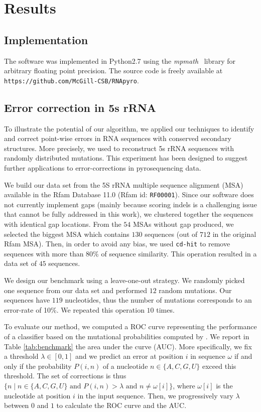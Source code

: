 \section{Results}
\label{sec:results}

\subsection{Implementation}
The software was implemented in Python2.7 using the \textit{mpmath}~\cite{mpmath} library
for  arbitrary floating point precision. The source code is freely available at \verb+https://github.com/McGill-CSB/RNApyro+.

\subsection{Error correction in 5s rRNA}

To illustrate the potential of our algorithm, we applied our techniques to identify and correct point-wise errors in RNA sequences
with conserved secondary structures. More precisely, we used \RNApyro to reconstruct 5s rRNA sequences with randomly distributed
mutations. This experiment has been designed to suggest further applications to error-corrections in pyrosequencing data.

We build our data set from the 5S rRNA multiple sequence alignment (MSA) available in the Rfam Database 11.0 (Rfam id: \texttt{RF00001}).
Since our software does not currently implement gaps (mainly because scoring indels is a challenging issue that cannot be fully addressed
in this work),  we clustered together the sequences with identical gap locations. From the $54$ MSAs without gap produced, we selected the
biggest MSA  which contains $130$ sequences (out of $712$ in the original Rfam MSA). Then, in order to avoid any bias, we used \texttt{cd-hit}
\cite{CDHIT} to remove sequences with more than 80\% of sequence similarity. This operation resulted in a data set of $45$ sequences. 

We design our benchmark using a leave-one-out strategy. We randomly picked one sequence from our data set and performed $12$ random
mutations. Our sequences have $119$ nucleotides, thus the number of mutations corresponds to an error-rate of 10\%. We repeated this operation 
$10$ times. 

To evaluate our method, we computed a ROC curve representing the performance of a classifier based on the mutational probabilities computed by
\RNApyro. We report in Table \ref{tab:benchmark} the area under the curve (AUC). More specifically, we fix a threshold $\lambda \in [0,1]$ and we
predict an error at position $i$ in sequence $\omega$ if and only if the probability $P(i,n)$ of a nucleotide $n \in \{ A,C,G,U \}$ exceed this threshold.
The set of corrections is thus $\{ n \; | \;  n \in \{ A,C,G,U \} \mbox{ and } P(i,n) > \lambda \mbox{ and }  n \neq \omega[i] \}$, where $\omega[i]$ is the
nucleotide at position $i$ in the input sequence. Then, we progressively vary $\lambda$ between $0$ and $1$ to calculate the ROC curve and the AUC.



